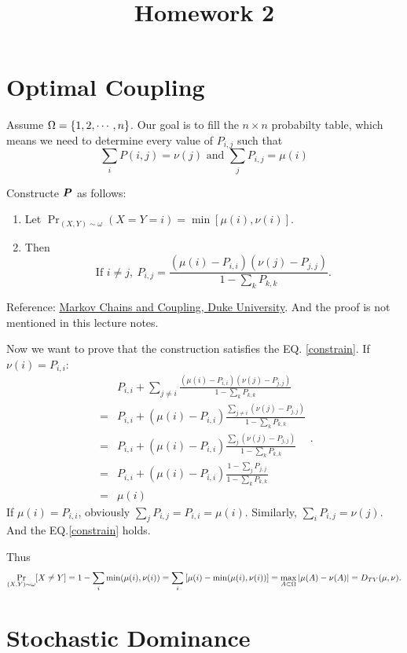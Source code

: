 \documentclass{article}
\begin{document}
\title{Homework 2}
\maketitle
\section{Optimal Coupling}
Assume $\Omega=\qty{1,2, \cdots,n}$.
Our goal is to fill the $n\times n$ probabilty table, which means we need to determine every value of $P_{i,j}$ such that
\begin{equation}
	\sum_i P(i,j)=\nu(j)\mbox{ and }\sum_j P_{i,j}=\mu(i)
	\label{constrain}
\end{equation}

Constructe $\boldsymbol{P}$ as follows:
\begin{enumerate}
	\item
	      Let $\Pr_{(X,Y)\sim \omega}(X=Y=i)=\min[\mu(i),\nu(i)]$.
	\item
	      Then
	      \[
		      \mbox{If }i\ne j,\ P_{i,j}=\frac{(\mu(i)-P_{i,i})(\nu(j)-P_{j,j})}{1-\sum_k{P_{k,k}}}
		      .\]
\end{enumerate}
Reference: \href{https://courses.cs.duke.edu/spring13/compsci590.2/slides/lec5.pdf}{Markov Chains and Coupling, Duke University}. And the proof is not mentioned in this lecture notes.

Now we want to prove that the construction satisfies the EQ. \ref{constrain}.
If $\nu(i)=P_{i,i}$:
\[
	\begin{aligned}
		 & P_{i,i}+
		\sum_{j\ne i}\frac{(\mu(i)-P_{i,i})(\nu(j)-P_{j,j})}{1-\sum_k{P_{k,k}}}
		\\[5pt]=&
		P_{i,i}+
		(\mu(i)-P_{i,i})\frac{\sum_{j\ne i}(\nu(j)-P_{j,j})}{1-\sum_k{P_{k,k}}}
		\\[5pt]=&
		P_{i,i}+
		(\mu(i)-P_{i,i})\frac{\sum_{j}(\nu(j)-P_{j,j})}{1-\sum_k{P_{k,k}}}
		\\[5pt]=&
		P_{i,i}+
		(\mu(i)-P_{i,i})\frac{1-\sum_{j}P_{j,j}}{1-\sum_k{P_{k,k}}}
		\\[5pt]=&
		\mu(i)
	\end{aligned}
	.\]
If $\mu(i)=P_{i,i}$, obviously  $\sum_jP_{i,j}=P_{i,i}=\mu(i)$. Similarly,  $\sum_iP_{i,j}=\nu(j)$. And the EQ.\ref{constrain} holds.

Thus
\[
	\Pr_{(X,Y)\sim\omega}[X\ne Y]=1-\sum_i\min(\mu(i),\nu(i))=\sum_i\qty[\mu(i)-\min(\mu(i),\nu(i))]=\max_{A\subset\Omega}\qty|\mu(A)-\nu(A)|=D_{TV}(\mu,\nu)
	.\]

\newpage
\section{Stochastic Dominance}
\end{document}
